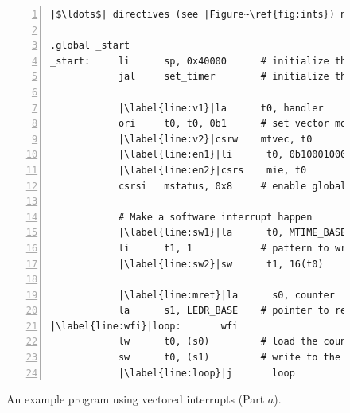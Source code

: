 \documentclass[11pt, twoside, pdftex]{article}
\begin{document}
\begin{figure}[H]
\begin{center}
\begin{minipage}[h]{15 cm}
\begin{lstlisting}[style=defaultNiosVStyle, name=vecs, numbers=left, escapechar=|]
|$\ldots$| directives (see |Figure~\ref{fig:ints}) not| shown

.global _start
_start:     li      sp, 0x40000      # initialize the stack location
            jal     set_timer        # initialize the timer 
     
            |\label{line:v1}|la      t0, handler      # get handler address
            ori     t0, t0, 0b1      # set vector mode
            |\label{line:v2}|csrw    mtvec, t0        # set trap address and mode
            |\label{line:en1}|li      t0, 0b10001000   # set the enable pattern
            |\label{line:en2}|csrs    mie, t0          # timer & software interrupts
            csrsi   mstatus, 0x8     # enable global interrupts

            # Make a software interrupt happen
            |\label{line:sw1}|la      t0, MTIME_BASE   # base address
            li      t1, 1            # pattern to write to msip
            |\label{line:sw2}|sw      t1, 16(t0)       # write to msip (sw interrupt)

            |\label{line:mret}|la      s0, counter      # pointer to counter
            la      s1, LEDR_BASE    # pointer to red lights
|\label{line:wfi}|loop:       wfi
            lw      t0, (s0)         # load the counter value
            sw      t0, (s1)         # write to the lights
            |\label{line:loop}|j       loop
\end{lstlisting}
	\caption{An example program using vectored interrupts (Part $a$).}
	\label{fig:vectored}
\end{minipage}
\end{center}
\end{figure}
\end{document}
